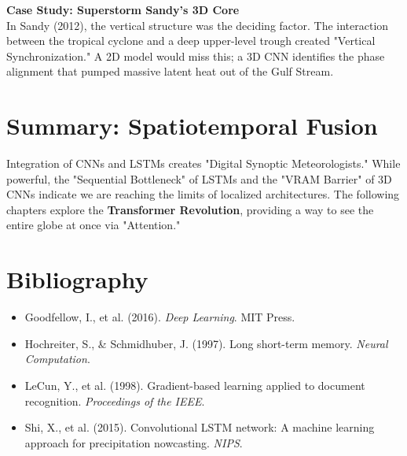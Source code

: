 \begin{infobox}
\textbf{Case Study: Superstorm Sandy's 3D Core}\\
In Sandy (2012), the vertical structure was the deciding factor. The interaction between the tropical cyclone and a deep upper-level trough created "Vertical Synchronization." A 2D model would miss this; a 3D CNN identifies the phase alignment that pumped massive latent heat out of the Gulf Stream.
\end{infobox}

\section{Summary: Spatiotemporal Fusion}

Integration of CNNs and LSTMs creates "Digital Synoptic Meteorologists." While powerful, the "Sequential Bottleneck" of LSTMs and the "VRAM Barrier" of 3D CNNs indicate we are reaching the limits of localized architectures. The following chapters explore the \textbf{Transformer Revolution}, providing a way to see the entire globe at once via "Attention."

\section*{Bibliography}
\begin{itemize}
    \item Goodfellow, I., et al. (2016). \textit{Deep Learning}. MIT Press.
    \item Hochreiter, S., \& Schmidhuber, J. (1997). Long short-term memory. \textit{Neural Computation}.
    \item LeCun, Y., et al. (1998). Gradient-based learning applied to document recognition. \textit{Proceedings of the IEEE}.
    \item Shi, X., et al. (2015). Convolutional LSTM network: A machine learning approach for precipitation nowcasting. \textit{NIPS}.
\end{itemize}

